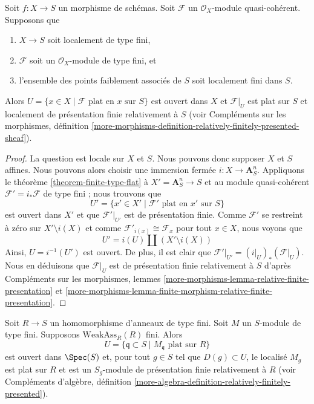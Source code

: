 \begin{lemma}
\label{lemma-finite-type-flat}
Soit $f : X \to S$ un morphisme de schémas.
Soit $\mathcal{F}$ un $\mathcal{O}_X$-module quasi-cohérent.
Supposons que
\begin{enumerate}
\item $X \to S$ soit localement de type fini,
\item $\mathcal{F}$ soit un $\mathcal{O}_X$-module de type fini, et
\item l'ensemble des points faiblement associés de $S$ soit localement fini dans $S$.
\end{enumerate}
Alors $U = \{x \in X \mid \mathcal{F}\text{ plat en }x\text{ sur }S\}$
est ouvert dans $X$ et $\mathcal{F}|_U$ est plat sur $S$ et localement
de présentation finie relativement à $S$ (voir
Compléments sur les morphismes, définition
\ref{more-morphisms-definition-relatively-finitely-presented-sheaf}).
\end{lemma}

\begin{proof}
La question est locale sur $X$ et $S$. Nous pouvons donc supposer $X$ et $S$ affines.
Nous pouvons alors choisir une immersion fermée $i : X \to \mathbf{A}^n_S$.
Appliquons le théorème \ref{theorem-finite-type-flat} à $X' = \mathbf{A}^n_S \to S$
et au module quasi-cohérent $\mathcal{F}' = i_*\mathcal{F}$ de type fini ;
nous trouvons que
$$
U' = \{x' \in X' \mid \mathcal{F}'\text{ plat en }x'\text{ sur }S\}
$$
est ouvert dans $X'$ et que $\mathcal{F}'|_{U'}$ est de présentation finie.
Comme $\mathcal{F}'$ se restreint à zéro sur $X' \setminus i(X)$ et
comme $\mathcal{F}'_{i(x)} \cong \mathcal{F}_x$ pour tout $x \in X$, nous voyons que
$$
U' = i(U) \amalg (X' \setminus i(X))
$$
Ainsi, $U = i^{-1}(U')$ est ouvert. De plus, il est clair que
$\mathcal{F}'|_{U'} = (i|_U)_*(\mathcal{F}|_U)$.
Nous en déduisons que $\mathcal{F}|_U$ est de présentation finie
relativement à $S$ d'après Compléments sur les morphismes, lemmes
\ref{more-morphisms-lemma-relative-finite-presentation} et
\ref{more-morphisms-lemma-finite-morphism-relative-finite-presentation}.
\end{proof}

\begin{lemma}
\label{lemma-finite-type-flat-algebra-bis}
Soit $R \to S$ un homomorphisme d'anneaux de type fini.
Soit $M$ un $S$-module de type fini.
Supposons $\text{WeakAss}_R(R)$ fini.
Alors
$$
U = \{\mathfrak q \subset S \mid M_{\mathfrak q}\text{ plat sur }R\}
$$
est ouvert dans $\Spec(S)$ et, pour tout $g \in S$ tel que
$D(g) \subset U$, le localisé $M_g$ est plat sur $R$ et
est un $S_g$-module de présentation finie relativement à $R$ (voir
Compléments d'algèbre, définition
\ref{more-algebra-definition-relatively-finitely-presented}).
\end{lemma}

